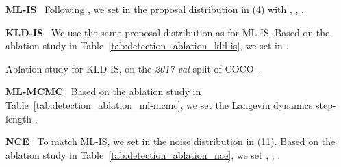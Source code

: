 \documentclass{bmvc2k}
\newcommand{\parsection}[1]{\vspace{2mm}\noindent\textbf{#1}~ }
\begin{document}
\begin{appendices}
\parsection{ML-IS}
Following \cite{gustafsson2019learning}, we set  in the proposal distribution  in (4) with , , .



\parsection{KLD-IS}
We use the same proposal distribution  as for ML-IS. Based on the ablation study in Table~\ref{tab:detection_ablation_kld-is}, we set  in .

\begin{table}
    \begin{minipage}{0.475\textwidth}\centering
        \caption{Ablation study for KLD-IS, on the \textit{2017 val} split of COCO~\cite{lin2014microsoft}.}\vspace{-1.0mm}
        	\label{tab:detection_ablation_kld-is}
    \end{minipage}
    \quad
    \begin{minipage}{0.475\textwidth}\centering
        \caption{Ablation study for ML-MCMC-1, on the \textit{2017 val} split of COCO~\cite{lin2014microsoft}.}\vspace{-1.0mm}
        	\label{tab:detection_ablation_ml-mcmc}
    \end{minipage}\end{table}



\parsection{ML-MCMC}
Based on the ablation study in Table~\ref{tab:detection_ablation_ml-mcmc}, we set the Langevin dynamics step-length .

\parsection{NCE}
To match ML-IS, we set  in the noise distribution  in (11). Based on the ablation study in Table~\ref{tab:detection_ablation_nce}, we set , , .


\end{appendices}
\end{document}
